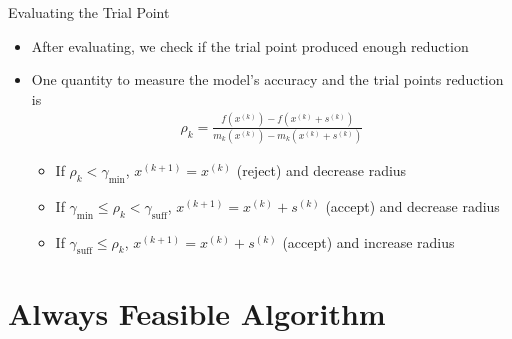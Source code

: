 \documentclass{beamer}
\newcommand{\xk}{{{x}^{(k)}}}
\begin{document}


\begin{frame}{Evaluating the Trial Point}
	\begin{itemize}
		\item After evaluating, we check if the trial point produced enough reduction
		\item One quantity to measure the model's accuracy and the trial points reduction is
\begin{align*}
	\rho_k = \frac{f\left(\xk\right) - f\left(\xk+s^{(k)}\right)}
		{m_k\left(\xk\right) - m_k\left(\xk+s^{(k)}\right)}
\end{align*}
		\begin{itemize}
			\item If $\rho_k < \gamma_{\textrm{min}}$, $x^{(k+1)}=\xk$ (reject) and decrease radius
			\item If $\gamma_{\textrm{min}} \le \rho_k < \gamma_{\textrm{suff}}$, $x^{(k+1)}=\xk+s^{(k)}$ (accept) and decrease radius
			\item If $\gamma_{\textrm{suff}} \le \rho_k$, $x^{(k+1)}=\xk+s^{(k)}$ (accept) and increase radius
		\end{itemize}
	\end{itemize}
\end{frame}


\section{Always Feasible Algorithm}
\end{document}
